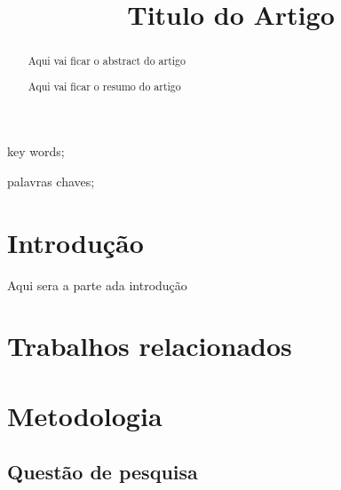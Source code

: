 \documentclass[10pt, conference, compsocconf]{IEEEtran}
\begin{document}
\title{Titulo do Artigo}

\author{
}

\maketitle
\begin{abstract}
Aqui vai ficar o abstract do artigo


\end{abstract}
\begin{IEEEkeywords}
	key words;
\end{IEEEkeywords}

\begin{abstract}
Aqui vai ficar o resumo do artigo
	
\end{abstract}

\begin{IEEEkeywords}
palavras chaves;

\end{IEEEkeywords}

\IEEEpeerreviewmaketitle

\section{Introdução}

Aqui sera a parte ada introdução

\section{Trabalhos relacionados} \label{sec:firstpage}

 
 

\section{Metodologia}


\subsection{Questão de pesquisa}
\end{document}
